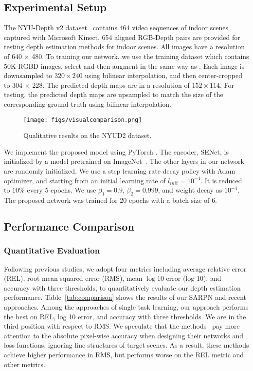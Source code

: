 \documentclass{article}
\begin{document}
\subsection{Experimental Setup}
The NYU-Depth v2 dataset~\cite{silberman2012indoor} contains 464 video sequences of indoor scenes captured with Microsoft Kinect. 
654 aligned RGB-Depth pairs are provided for testing depth estimation methods for indoor scenes. 
All images have a resolution of 640 $\times$ 480. 
To training our network, we use the training dataset which contains 50K RGBD images, select and then augment in the same way as \cite{hu2019revisiting}. 
Each image is downsampled to $320 \times 240$ using bilinear interpolation, and then center-cropped to 304 $\times$ 228.
The predicted depth maps are in a resolution of $152\times 114$.
For testing, the predicted depth maps are upsampled to match the size of the corresponding ground truth using bilinear interpolation.
\begin{figure*}  
	\centering 
	\texttt{[image: figs/visualcomparison.png]}
	\caption{Qualitative results on the NYUD2 dataset.}
	\label{fig:visual-comp}
\end{figure*}

We implement the proposed model using PyTorch \cite{paszke2017automatic}.
The encoder, SENet, is initialized by a model pretrained on ImageNet~\cite{deng2009imagenet}. 
The other layers in our network are randomly initialized. 
We use a step learning rate decay policy with Adam optimizer, and starting from an initial learning rate of $l_{init}=10^{-4}$. It is reduced to $10\%$ every 5 epochs. 
We use $\beta _1=0.9$, $\beta_2=0.999$, and weight decay as $10^{-4}$. 
The proposed network was trained for 20 epochs with a batch size of 6.

\subsection{Performance Comparison} 
\subsubsection{Quantitative Evaluation} 
Following previous studies, we adopt four metrics including average relative error (REL), root mean squared error (RMS), mean $\log 10$ error (log 10), and accuracy with three thresholds, to quantitatively evaluate our depth estimation performance.
Table~\ref{tab:comparison} shows the results of our SARPN and recent approaches. 
Among the approaches of single task learning, our approach performs the best on REL, log 10 error, and accuracy with three thresholds.
We are in the third position with respect to RMS.
We speculate that the methods~\cite{fu2018deep,jiao2018look} pay more attention to the absolute pixel-wise accuracy when designing their networks and loss functions, ignoring fine structures of target scenes. 
As a result, these methods achieve higher performance in RMS, but performs worse on the REL metric and other metrics. 
\end{document}
